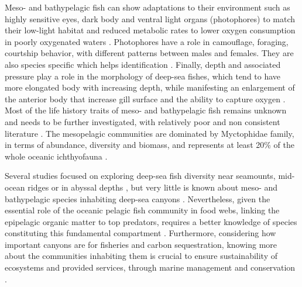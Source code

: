 Meso- and bathypelagic fish can show adaptations to their environment such as highly sensitive eyes, dark body and ventral light organs (photophores) to match their low-light habitat and reduced metabolic rates to lower oxygen consumption in poorly oxygenated waters \citep{salvanes2009,farre2016}. Photophores have a role in camouflage, foraging, courtship behavior, with different patterns between males and females. They are also species specific which helps identification \citep{paitio2020,salvanes2009}. Finally, depth and associated pressure play a role in the morphology of deep-sea fishes, which tend to have more elongated body with increasing depth, while manifesting an enlargement of the anterior body that increase gill surface and the ability to capture oxygen \citep{farre2016}. Most of the life history traits of meso- and bathypelagic fish remains unknown and needs to be further investigated, with relatively poor and non consistent literature \citep{childress1980,salvanes2009}. The mesopelagic communities are dominated by Myctophidae family, in terms of abundance, diversity and biomass, and represents at least 20\% of the whole oceanic ichthyofauna \citep{catul2011,kozlov1995,pusch2004}.


Several studies focused on exploring deep-sea fish diversity near seamounts, mid-ocean ridges or in abyssal depths \citep{cook2013,sutton2013}, but very little is known about meso- and bathypelagic species inhabiting deep-sea canyons \citep{kenchington2020}. Nevertheless, given the essential role of the oceanic pelagic fish community in food webs, linking the epipelagic organic matter to top predators, requires a better knowledge of species constituting this fundamental compartment \citep{davison2015,gaskett2001}. Furthermore, considering how important canyons are for fisheries and carbon sequestration, knowing more about the communities inhabiting them is crucial to ensure sustainability of ecosystems and provided services, through marine management and conservation \citep{fernandez-arcaya2017,vandenbeld2017a}.

